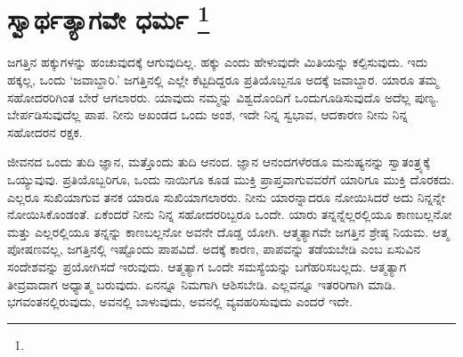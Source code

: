 
\vspace{-0.8cm}

\chapter[ಸ್ವಾರ್ಥತ್ಯಾಗವೇ ಧರ್ಮ ]{ಸ್ವಾರ್ಥತ್ಯಾಗವೇ ಧರ್ಮ \protect\footnote{}}

ಜಗತ್ತಿನ ಹಕ್ಕುಗಳನ್ನು ಹಂಚುವುದಕ್ಕೆ ಆಗುವುದಿಲ್ಲ. ಹಕ್ಕು ಎಂದು ಹೇಳುವುದೇ ಮಿತಿಯನ್ನು ಕಲ್ಪಿಸುವುದು. ಇದು ಹಕ್ಕಲ್ಲ, ಒಂದು ‘ಜವಾಬ್ದಾರಿ.’ ಜಗತ್ತಿನಲ್ಲಿ ಎಲ್ಲೇ ಕೆಟ್ಟದಿದ್ದರೂ ಪ್ರತಿಯೊಬ್ಬನೂ ಅದಕ್ಕೆ ಜವಾಬ್ದಾರ. ಯಾರೂ ತಮ್ಮ ಸಹೋದರರಿಗಿಂತ ಬೇರೆ ಆಗಲಾರರು. ಯಾವುದು ನಮ್ಮನ್ನು ವಿಶ್ವದೊಂದಿಗೆ ಒಂದುಗೂಡಿಸುವುದೊ ಅದೆಲ್ಲ ಪುಣ್ಯ. ಬೇರ್ಪಡಿಸುವುದೆಲ್ಲ ಪಾಪ. ನೀನು ಅಖಂಡದ ಒಂದು ಅಂಶ, ಇದೇ ನಿನ್ನ ಸ್ವಭಾವ, ಆದಕಾರಣ ನೀನು ನಿನ್ನ ಸಹೋದರನ ರಕ್ಷಕ.

ಜೀವನದ ಒಂದು ತುದಿ ಜ್ಞಾನ, ಮತ್ತೊಂದು ತುದಿ ಆನಂದ. ಜ್ಞಾನ ಆನಂದಗಳೆರಡೂ ಮನುಷ್ಯನನ್ನು ಸ್ವಾತಂತ್ರ್ಯಕ್ಕೆ ಒಯ್ಯುವುವು. ಪ್ರತಿಯೊಬ್ಬರಿಗೂ, ಒಂದು ನಾಯಿಗೂ ಕೂಡ ಮುಕ್ತಿ ಪ್ರಾಪ್ತವಾಗುವವರೆಗೆ ಯಾರಿಗೂ ಮುಕ್ತಿ ದೊರಕದು. ಎಲ್ಲರೂ ಸುಖಿಯಾಗುವ ತನಕ ಯಾರೂ ಸುಖಿಯಾಗಲಾರರು. ನೀನು ಯಾರನ್ನಾದರೂ ನೋಯಿಸಿದರೆ ಅದು ನಿನ್ನನ್ನೇ ನೋಯಿಸಿಕೊಂಡಂತೆ. ಏಕೆಂದರೆ ನೀನು ನಿನ್ನ ಸಹೋದರರಿಬ್ಬರೂ ಒಂದೇ. ಯಾರು ತನ್ನನ್ನೆಲ್ಲರಲ್ಲಿಯೂ ಕಾಣಬಲ್ಲನೋ ಮತ್ತು ಎಲ್ಲರಲ್ಲಿಯೂ ತನ್ನನ್ನು ಕಾಣಬಲ್ಲನೋ ಅವನೇ ದೊಡ್ಡ ಯೋಗಿ. ಆತ್ಮತ್ಯಾಗವೇ ಜಗತ್ತಿನ ಶ್ರೇಷ್ಠ ನಿಯಮ. ಆತ್ಮ ಪೋಷಣವಲ್ಲ, ಜಗತ್ತಿನಲ್ಲಿ ಇಷ್ಟೊಂದು ಪಾಪವಿದೆ. ಅದಕ್ಕೆ ಕಾರಣ, ಪಾಪವನ್ನು ತಡೆಯಬೇಡಿ ಎಂಬ ಏಸುವಿನ ಸಂದೇಶವನ್ನು ಪ್ರಯೋಗಿಸದೆ ಇರುವುದು. ಆತ್ಮತ್ಯಾಗ ಒಂದೇ ಸಮಸ್ಯೆಯನ್ನು ಬಗೆಹರಿಸಬಲ್ಲದು. ಆತ್ಮತ್ಯಾಗ ತೀವ್ರವಾದಾಗ ಅಧ್ಯಾತ್ಮ ಬರುವುದು. ಏನನ್ನೂ ನಿಮಗಾಗಿ ಆಶಿಸಬೇಡಿ. ಎಲ್ಲವನ್ನೂ ಇತರರಿಗಾಗಿ ಮಾಡಿ. ಭಗವಂತನಲ್ಲಿರುವುದು, ಅವನಲ್ಲಿ ಬಾಳುವುದು, ಅವನಲ್ಲಿ ವ್ಯವಹರಿಸುವುದು ಎಂದರೆ ಇದೇ.

